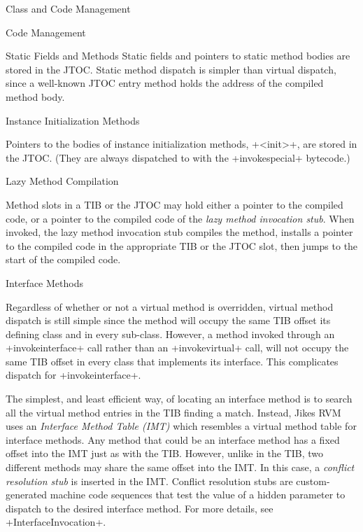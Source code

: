 \begin{section}{Class and Code Management}
\begin{subsection}{Code Management}
\begin{subsubsection}{Static Fields and Methods}
Static fields and pointers to static method bodies are stored in the JTOC. Static method dispatch is simpler than virtual dispatch, since a well-known JTOC entry method holds the address of the compiled method body.

\end{subsubsection}

\begin{subsubsection}{Instance Initialization Methods}

Pointers to the bodies of instance initialization methods, \spverb+<init>+, are stored in the JTOC. (They are always dispatched to with the \spverb+invokespecial+ bytecode.)

\end{subsubsection}

\begin{subsubsection}{Lazy Method Compilation}

Method slots in a TIB or the JTOC may hold either a pointer to the compiled code, or a pointer to the compiled code of the \textit{lazy method invocation stub}. When invoked, the lazy method invocation stub compiles the method, installs a pointer to the compiled code in the appropriate TIB or the JTOC slot, then jumps to the start of the compiled code.

\end{subsubsection}

\begin{subsubsection}{Interface Methods}

Regardless of whether or not a virtual method is overridden, virtual method dispatch is still simple since the method will occupy the same TIB offset its defining class and in every sub-class. However, a method invoked through an \spverb+invokeinterface+ call rather than an \spverb+invokevirtual+ call, will not occupy the same TIB offset in every class that implements its interface. This complicates dispatch for \spverb+invokeinterface+.

The simplest, and least efficient way, of locating an interface method is to search all the virtual method entries in the TIB finding a match. Instead, Jikes RVM uses an \textit{Interface Method Table (IMT)} which resembles a virtual method table for interface methods. Any method that could be an interface method has a fixed offset into the IMT just as with the TIB. However, unlike in the TIB, two different methods may share the same offset into the IMT. In this case, a \textit{conflict resolution stub} is inserted in the IMT. Conflict resolution stubs are custom-generated machine code sequences that test the value of a hidden parameter to dispatch to the desired interface method. For more details, see \spverb+InterfaceInvocation+.

\end{subsubsection}

\end{subsection}

\end{section}
